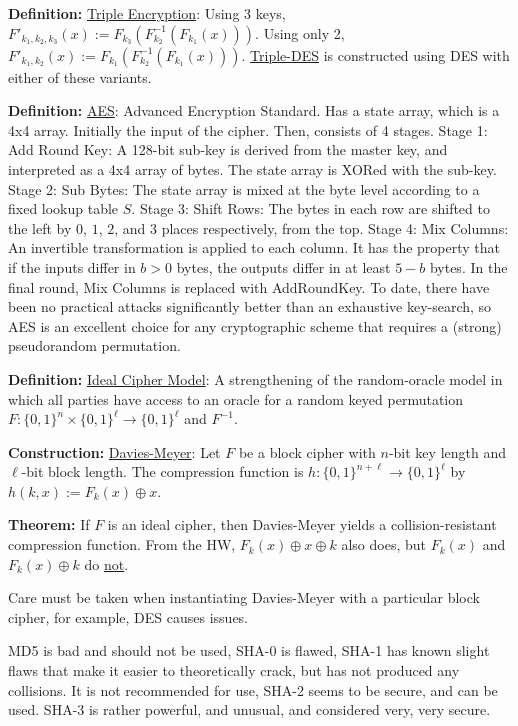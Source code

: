 \documentclass[12pt]{article}
\newcommand{\defn}[1]{{\bf Definition:} \underline{#1}}
\newcommand{\thm}[1]{{\bf Theorem:} \underline{#1}}
\newcommand{\con}[1]{{\bf Construction:} \underline{#1}}
\newcommand{\xor}{\oplus}
\begin{document}
\begin{multicols}{2}
\defn{Triple Encryption}: Using 3 keys, $F'_{k_1,k_2,k_3}(x):=F_{k_3}(F_{k_2}^{-1}(F_{k_1}(x)))$. Using only 2, $F'_{k_1,k_2}(x):=F_{k_1}(F_{k_2}^{-1}(F_{k_1}(x)))$. \underline{Triple-DES} is constructed using DES with either of these variants.

\defn{AES}: Advanced Encryption Standard. Has a state array, which is a 4x4 array. Initially the input of the cipher. Then, consists of 4 stages. Stage 1: Add Round Key: A 128-bit sub-key is derived from the master key, and interpreted as a 4x4 array of bytes. The state array is XORed with the sub-key. Stage 2: Sub Bytes: The state array is mixed at the byte level according to a fixed lookup table $S$. Stage 3: Shift Rows: The bytes in each row are shifted to the left by $0$, $1$, $2$, and $3$ places respectively, from the top. Stage 4: Mix Columns: An invertible transformation is applied to each column. It has the property that if the inputs differ in $b>0$ bytes, the outputs differ in at least $5-b$ bytes. In the final round, Mix Columns is replaced with AddRoundKey. To date, there have been no practical attacks significantly better than an exhaustive key-search, so AES is an excellent choice for any cryptographic scheme that requires a (strong) pseudorandom permutation.

\defn{Ideal Cipher Model}: A strengthening of the random-oracle model in which all parties have access to an oracle for a random keyed permutation $F:\{0,1\}^n\times\{0,1\}^\ell\to\{0,1\}^\ell$ and $F^{-1}$.

\con{Davies-Meyer}: Let $F$ be a block cipher with $n$-bit key length and $\ell$-bit block length. The compression function is $h:\{0,1\}^{n+\ell}\to\{0,1\}^\ell$ by $h(k,x):=F_k(x)\xor x$.

\thm{}If $F$ is an ideal cipher, then Davies-Meyer yields a collision-resistant compression function. From the HW, $F_k(x)\xor x\xor k$ also does, but $F_k(x)$ and $F_k(x)\xor k$ do \underline{not}.

Care must be taken when instantiating Davies-Meyer with a particular block cipher, for example, DES causes issues.

MD5 is bad and should not be used, SHA-0 is flawed, SHA-1 has known slight flaws that make it easier to theoretically crack, but has not produced any collisions. It is not recommended for use, SHA-2 seems to be secure, and can be used. SHA-3 is rather powerful, and unusual, and considered very, very secure.

\end{multicols}
\end{document}

